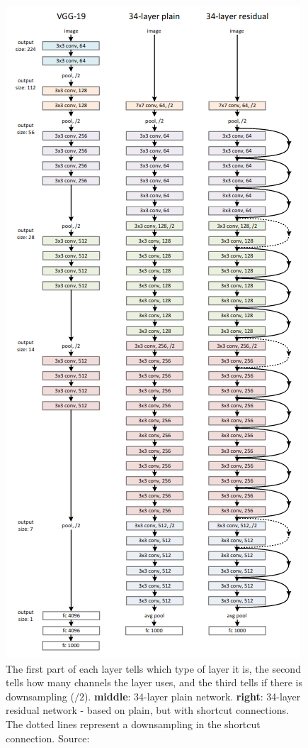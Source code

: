 \begin{figure}
    \centering
    \includegraphics[scale=0.69]{assets/residual-net.png}
    \caption{The first part of each layer tells which type of layer it is, the second tells how many channels the layer uses, and the third tells if there is downsampling ($/2$). \textbf{middle}: 34-layer plain network. \textbf{right}: 34-layer residual network - based on plain, but with shortcut connections. The dotted lines represent a downsampling in the shortcut connection. Source: \cite{resnet}}
    \label{fig:resnet}
\end{figure}

